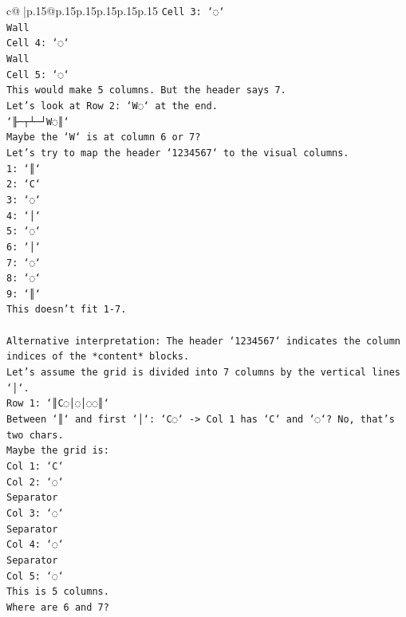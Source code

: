 \documentclass{article}
\begin{document}
{\begin{supertabular}{c@{$\;$}|p{.15\linewidth}@{}p{.15\linewidth}p{.15\linewidth}p{.15\linewidth}p{.15\linewidth}p{.15\linewidth}}
{{{\texttt{Cell 3: `◌`} \\
\texttt{Wall} \\
\texttt{Cell 4: `◌`} \\
\texttt{Wall} \\
\texttt{Cell 5: `◌`} \\
\texttt{This would make 5 columns. But the header says 7.} \\
\texttt{Let's look at Row 2: `W◌` at the end.} \\
\texttt{`╟─┬┴─┘W◌║`} \\
\texttt{Maybe the `W` is at column 6 or 7?} \\
\texttt{Let's try to map the header `1234567` to the visual columns.} \\
\texttt{1: `║`} \\
\texttt{2: `C`} \\
\texttt{3: `◌`} \\
\texttt{4: `│`} \\
\texttt{5: `◌`} \\
\texttt{6: `│`} \\
\texttt{7: `◌`} \\
\texttt{8: `◌`} \\
\texttt{9: `║`} \\
\texttt{This doesn't fit 1{-}7.} \\
\\ 
\texttt{Alternative interpretation: The header `1234567` indicates the column indices of the *content* blocks.} \\
\texttt{Let's assume the grid is divided into 7 columns by the vertical lines `│`.} \\
\texttt{Row 1: `║C◌│◌│◌◌║`} \\
\texttt{Between `║` and first `│`: `C◌` {-}> Col 1 has `C` and `◌`? No, that's two chars.} \\
\texttt{Maybe the grid is:} \\
\texttt{Col 1: `C`} \\
\texttt{Col 2: `◌`} \\
\texttt{Separator} \\
\texttt{Col 3: `◌`} \\
\texttt{Separator} \\
\texttt{Col 4: `◌`} \\
\texttt{Separator} \\
\texttt{Col 5: `◌`} \\
\texttt{This is 5 columns.} \\
\texttt{Where are 6 and 7?} \\
}}}
\end{supertabular}}
\end{document}
